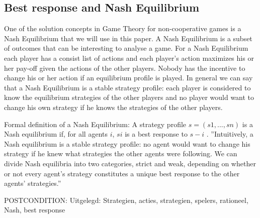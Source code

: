

\subsection{Best response and Nash Equilibrium}
One of the solution concepts in Game Theory for non-cooperative games is a Nash Equilibrium that we will use in this paper. A Nash Equilibrium is a subset of outcomes that can be interesting to analyse a game. For a Nash Equilibrium each player has a consist list of actions and each player's action maximizes his or her pay-off given the actions of the other players. Nobody has the incentive to change his or her action if an equilibrium profile is played. In general we can say that a Nash Equilibrium is a stable strategy profile: each player is considered to know the equilibrium strategies of the other players and no player would want to change his own strategy if he knows the strategies of the other players. 

Formal definition of a Nash Equilibrium:
A strategy profile $s = (s1, . . . , sn)$ is a Nash equilibrium
if, for all agents $i$, $si$ is a best response to $s-i$ .
''Intuitively, a Nash equilibrium is a stable strategy profile: no agent would want to change
his strategy if he knew what strategies the other agents were following.
We can divide Nash equilibria into two categories, strict and weak, depending on whether
or not every agent's strategy constitutes a unique best response to the other agents' strategies.''



POSTCONDITION: Uitgelegd: Strategien, acties, strategien, spelers, rationeel, Nash, best response

